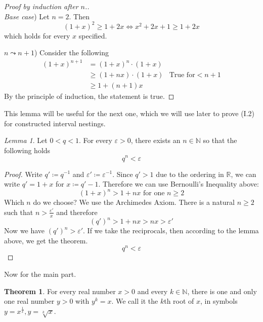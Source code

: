 \documentclass[a4paper, 10pt]{article}
\theoremstyle{remark}
\newtheorem{lemma}{Lemma}
\theoremstyle{definition}
\newtheorem{theorem}{Theorem}
\begin{document}
    \begin{proof}[Proof by induction after \(n\).] \phantom{}\\
        \emph{Base case})
            Let \(n = 2\). Then
            \[
                (1+x)^2 \geq 1 + 2x \Leftrightarrow x^2+2x+1 \geq 1 + 2x
            \]
            which holds for every \(x\) specified.
        
        \(n \leadsto n + 1\))
            Consider the following
            \begin{align*}
                (1+x)^{n+1} &= (1+x)^n \cdot (1+x)\\
                            &\geq (1+nx) \cdot (1+x) & \text{True for} < n + 1\\
                            &\geq 1+(n+1)x
            \end{align*}
            By the principle of induction, the statement is true.
    \end{proof}

    This lemma will be useful for the next one, which we will use later to prove (I.2) for constructed interval nestings.

    \begin{lemma}
        Let \(0 < q < 1\). For every \(\varepsilon > 0\), there exists an \(n \in \mathbb{N}\) so that the following holds
        \[
            q^n < \varepsilon
        \]
    \end{lemma}

    \begin{proof}
        Write \(q' \coloneqq q^{-1}\) and \(\varepsilon' \coloneqq \varepsilon^{-1}\). Since \(q' > 1\) due to the ordering in \(\mathbb{R}\), we can write \(q' = 1 + x\) for \(x \coloneqq q' - 1\). Therefore we can use Bernoulli's Inequality above:
        \[
            (1+x)^n > 1 + nx \text{ for one } n \geq 2
        \]
        Which \(n\) do we choose? We use the Archimedes Axiom. There is a natural \(n \geq 2\) such that \(n > \frac{\varepsilon'}{x}\) and therefore
        \[
            (q')^n > 1 + nx > nx > \varepsilon'
        \]
        Now we have \((q')^n > \varepsilon'\). If we take the reciprocals, then according to the lemma above, we get the theorem.
        \[
            q^n < \varepsilon
        \]
    \end{proof}

    Now for the main part.

    \begin{theorem}
        For every real number \(x > 0\) and every \(k \in \mathbb{N}\), there is one and only one real number \(y > 0\) with \(y^k = x\). We call it the \(k\)th root of \(x\), in symbols \(y = x^\frac{1}{x}, y = \sqrt[k]{x}\).
    \end{theorem}
\end{document}
